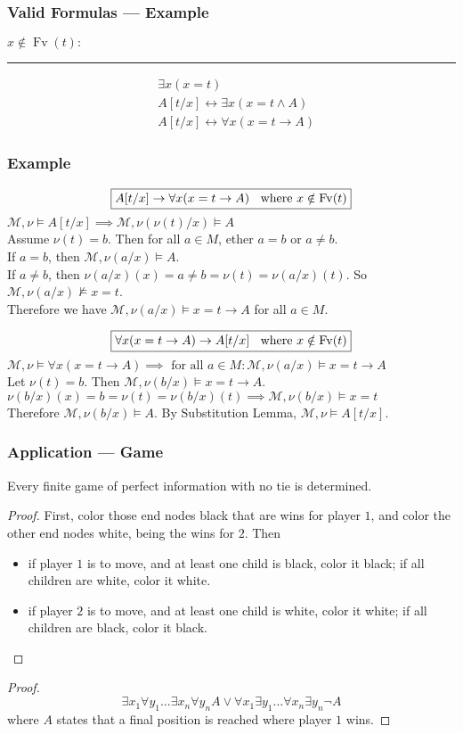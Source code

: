 \documentclass[UTF8,11pt,colorlinks,compress,openany]{beamer}%
\begin{document}
\begin{frame}\frametitle{Valid Formulas --- Example}
	$x\notin \operatorname{Fv}(t):$
	\hrule
	\begin{align*}
	&\exists x(x=t)\\
	& A[t/x]\leftrightarrow\exists x (x=t\wedge A)\\
	& A[t/x]\leftrightarrow\forall x(x=t\to A)
	\end{align*}
\end{frame}

\begin{frame}\frametitle{Example}
\[\fbox{$A[t/x]\to\forall x(x=t\to A)\;\; \mbox{ where } x\notin\operatorname{Fv}(t)$}\]
$\mathcal{M},\nu\vDash A[t/x]\implies\mathcal{M},\nu(\nu(t)/x)\vDash A$\\
Assume $\nu(t)=b$. Then for all $a\in M$, ether $a=b$ or $a\ne b$.\\
If $a=b$, then $\mathcal{M},\nu(a/x)\vDash A$.\\
If $a\ne b$, then $\nu(a/x)(x)=a\ne b=\nu(t)=\nu(a/x)(t)$. So $\mathcal{M},\nu(a/x)\nvDash x=t$.\\
Therefore we have $\mathcal{M},\nu(a/x)\vDash x=t\to A$ for all $a\in M$.

\[\fbox{$\forall x(x=t\to A)\to A[t/x]\;\; \mbox{ where } x\notin\operatorname{Fv}(t)$}\]
$\mathcal{M},\nu\vDash\forall x(x=t\to A)\implies \mbox{ for all } a\in M: \mathcal{M},\nu(a/x)\vDash x=t\to A$\\
Let $\nu(t)=b$. Then $\mathcal{M},\nu(b/x)\vDash x=t\to A$.\\
$\nu(b/x)(x)=b=\nu(t)=\nu(b/x)(t)\implies\mathcal{M},\nu(b/x)\vDash x=t$\\
Therefore $\mathcal{M},\nu(b/x)\vDash A$. By Substitution Lemma, $\mathcal{M},\nu\vDash A[t/x]$.
\end{frame}

\begin{frame}\frametitle{Application --- Game}
	\begin{theorem}
		Every finite game of perfect information with no tie is determined.
	\end{theorem}
	\begin{proof}
		First, color those end nodes black that are wins for player $1$, and color the other end nodes white, being the wins for $2$. Then
		\begin{itemize}
			\item if player $1$ is to move, and at least one child is black, color it black; if all children are white, color it white.
			\item if player $2$ is to move, and at least one child is white, color it white; if all children are black, color it black.
		\end{itemize}
	\end{proof}
	\begin{proof}
		\[\exists x_1\forall y_1\dots\exists x_n\forall y_n A\vee\forall x_1\exists y_1\dots\forall x_n\exists y_n\neg A\]
		where $A$ states that a final position is reached where player $1$ wins.
	\end{proof}
\end{frame}
\end{document}
